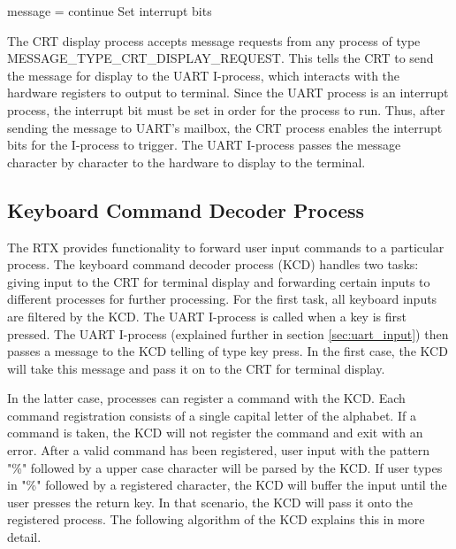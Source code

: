 \documentclass[12pt]{report}
\begin{document}
\begin{algorithmic}
        \State message = 
            \State continue
        \EndIf
        \State {}
        \State Set interrupt bits
    \EndWhile
  \EndFunction
 \end{algorithmic}

 The CRT display process accepts message requests from any process of type MESSAGE\_TYPE\_CRT\_DISPLAY\_REQUEST. This tells the CRT to send the message for display to the UART I-process, which interacts with the hardware registers to output to terminal. Since the UART process is an interrupt process, the interrupt bit must be set in order for the process to run. Thus, after sending the message to UART's mailbox, the CRT process enables the interrupt bits for the I-process to trigger. The UART I-process passes the message character by character to the hardware to display to the terminal.

\subsection{Keyboard Command Decoder Process}
\label{sec:kcd_process}
The RTX provides functionality to forward user input commands to a particular process. The keyboard command decoder process (KCD) handles two tasks: giving input to the CRT for terminal display and forwarding certain inputs to different processes for further processing. For the first task, all keyboard inputs are filtered by the KCD. The UART I-process is called when a key is first pressed. The UART I-process (explained further in section \ref{sec:uart_input}) then passes a message to the KCD telling of type key press. In the first case, the KCD will take this message and pass it on to the CRT for terminal display.

In the latter case, processes can register a command with the KCD. Each command registration consists of a single capital letter of the alphabet. If a command is taken, the KCD will not register the command and exit with an error. After a valid command has been registered, user input with the pattern "\%" followed by a upper case character will be parsed by the KCD. If user types in "\%" followed by a registered character, the KCD will buffer the input until the user presses the return key. In that scenario, the KCD will pass it onto the registered process. The following algorithm of the KCD explains this in more detail.
\end{document}
